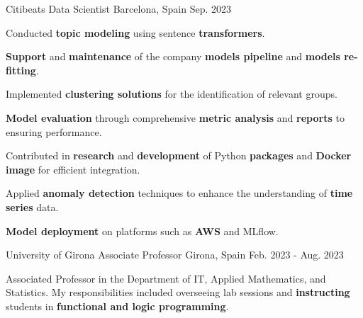 

\begin{cventries}


  \cventry
  {Citibeats} %
  {Data Scientist} %
  {Barcelona, Spain} %
  {Sep. 2023} %
  { 
  \begin{cvitems}
    \item {Conducted \textbf{topic modeling} using sentence \textbf{transformers}.}
	\item {\textbf{Support} and \textbf{maintenance} of the company \textbf{models pipeline} and \textbf{models re-fitting}.}
    \item {Implemented \textbf{clustering solutions} for the identification of relevant groups.}
    \item {\textbf{Model evaluation} through comprehensive \textbf{metric analysis} and \textbf{reports} to ensuring performance.}
    \item {Contributed in \textbf{research} and \textbf{development} of  Python \textbf{packages} and \textbf{Docker image} for efficient integration.}
    \item {Applied \textbf{anomaly detection} techniques to enhance the understanding of \textbf{time series} data.}
    \item {\textbf{Model deployment} on platforms such as \textbf{AWS } and MLflow.}
  \end{cvitems}
}


  \cventry
  {University of Girona} %
  {Associate Professor} %
  {Girona, Spain} %
  {Feb. 2023 - Aug. 2023} %
  {
    \begin{cvitems} %
    \item {Associated Professor in the Department of IT,
      Applied Mathematics, and Statistics.
      My responsibilities included overseeing lab sessions and \textbf{instructing} students in \textbf{functional and logic programming}.}
    \end{cvitems}
    }



\end{cventries}
